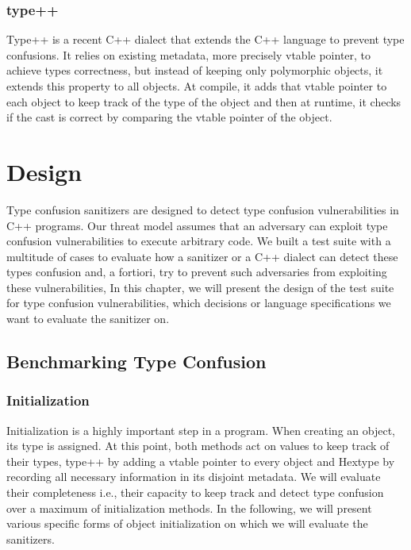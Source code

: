 \documentclass[a4paper,11pt,oneside]{report}
\begin{document}
\subsection{type++}

Type++ is a recent C++ dialect that extends the C++ language to prevent type
confusions. It relies on existing metadata, more precisely vtable pointer, to achieve types correctness,
but instead of keeping only polymorphic objects, it extends this property to all objects.
At compile, it adds that vtable pointer to each object to keep track of the type of the object
and then at runtime, it checks if the cast is correct by comparing the vtable pointer of the object.

\chapter{Design}

Type confusion sanitizers are designed to detect type confusion vulnerabilities
in C++ programs.  Our threat model assumes that an adversary can exploit type
confusion vulnerabilities to execute arbitrary code.  We built a test suite with
a multitude of cases to evaluate how a sanitizer or a C++ dialect can detect
these types confusion and, a fortiori, try to prevent such adversaries from
exploiting these vulnerabilities, In this chapter, we will present the design of
the test suite for type confusion vulnerabilities, which decisions or language
specifications we want to evaluate the sanitizer on.

\section{Benchmarking Type Confusion}

\subsection{Initialization}

\noindent{}Initialization is a highly important step in a program. When creating 
an object, its type is assigned. At this point, both methods act on
values to keep track of their types, type++ by adding a vtable pointer to every
object and Hextype by recording all necessary information in its disjoint
metadata. We will evaluate their completeness i.e., their capacity to keep track 
and detect type confusion over a maximum of initialization methods. 
In the following, we will present various specific forms of object initialization 
on which we will evaluate the sanitizers.
\end{document}
